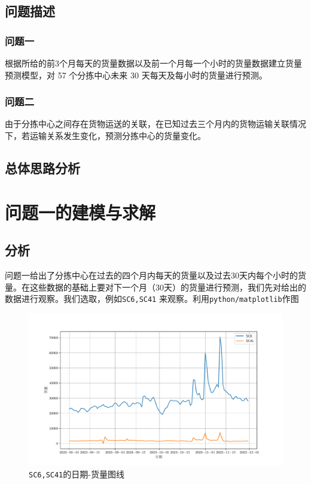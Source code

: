 \documentclass[UTF8,a4paper,10 pt]{article}%
\begin{document}
\subsection{问题描述}
\subsubsection{问题一}
根据所给的前3个月每天的货量数据以及前一个月每一个小时的货量数据建立货量预测模型，对 57 个分拣中心未来 30 天每天及每小时的货量进行预测。

\subsubsection{问题二}
由于分拣中心之间存在货物运送的关联，在已知过去三个月内的货物运输关联情况下，若运输关系发生变化，预测分拣中心的货量变化。
\subsection{总体思路分析}

\clearpage
\section{问题一的建模与求解}
\subsection{分析}
问题一给出了分拣中心在过去的四个月内每天的货量以及过去30天内每个小时的货量。在这些数据的基础上要对下一个月（30天）的货量进行预测，我们先对给出的数据进行观察。我们选取，例如{\tt SC6,SC41} 来观察。利用{\tt python/matplotlib}作图

\begin{figure}[!ht]
	\centering
	\includegraphics*[width=0.8\linewidth]{images/example.pdf}
	\caption{{\tt SC6,SC41}的日期-货量图线}
\end{figure}
\end{document}

